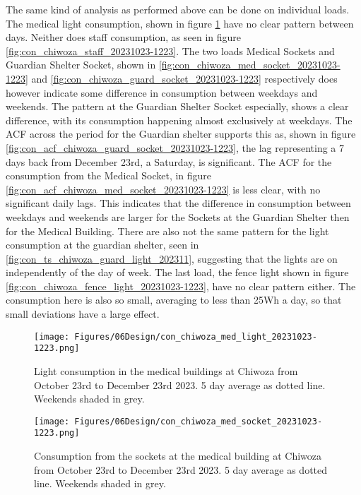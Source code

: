 The same kind of analysis as performed above can be done on individual loads. The medical light consumption, shown in figure \ref{fig:con_chiwoza_med_light_20231023-1223} have no clear pattern between days. Neither does staff consumption, as seen in figure \ref{fig:con_chiwoza_staff_20231023-1223}. The two loads Medical Sockets and Guardian Shelter Socket, shown in \autoref{fig:con_chiwoza_med_socket_20231023-1223} and \autoref{fig:con_chiwoza_guard_socket_20231023-1223} respectively does however indicate some difference in consumption between weekdays and weekends. The pattern at the Guardian Shelter Socket especially, shows a clear difference, with its consumption happening almost exclusively at weekdays. The ACF across the period for the Guardian shelter supports this as, shown in figure \ref{fig:con_acf_chiwoza_guard_socket_20231023-1223}, the lag representing a 7 days back from December 23rd, a Saturday, is significant. The ACF for the consumption from the Medical Socket, in figure \ref{fig:con_acf_chiwoza_med_socket_20231023-1223} is less clear, with no significant daily lags. This indicates that the difference in consumption between weekdays and weekends are larger for the Sockets at the Guardian Shelter then for the Medical Building. There are also not the same pattern for the light consumption at the guardian shelter, seen in \ref{fig:con_ts_chiwoza_guard_light_202311}, suggesting that the lights are on independently of the day of week. The last load, the fence light shown in figure \ref{fig:con_chiwoza_fence_light_20231023-1223}, have no clear pattern either. The consumption here is also so small, averaging to less than 25Wh a day, so that small deviations have a large effect. \\

\begin{figure}
    \centering
    \texttt{[image: Figures/06Design/con\_chiwoza\_med\_light\_20231023-1223.png]}
    \caption[Medical Light consumption Chiwoza 20231023-1223]{Light consumption in the medical buildings at Chiwoza from October 23rd to December 23rd 2023. 5 day average as dotted line. Weekends shaded in grey.}
    \label{fig:con_chiwoza_med_light_20231023-1223}
\end{figure}

\begin{figure}
    \centering
    \texttt{[image: Figures/06Design/con\_chiwoza\_med\_socket\_20231023-1223.png]}
    \caption[Medical Socket consumption Chiwoza 20231023-1223]{Consumption from the sockets at the medical building at Chiwoza from October 23rd to December 23rd 2023. 5 day average as dotted line. Weekends shaded in grey.}
    \label{fig:con_chiwoza_med_socket_20231023-1223}
\end{figure}

